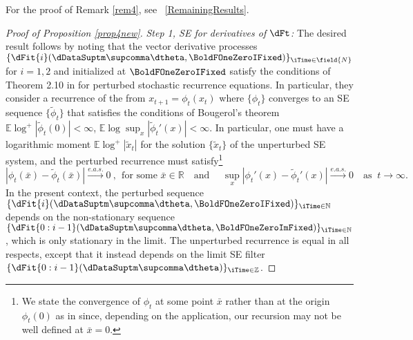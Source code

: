 



\proofskip\noindent 
For the proof of Remark \ref{rem4}, see \SupplementaryAppendix\ \ref{RemainingResults}.


\proofskip
%
%
%
%
\begin{proof}[Proof of Proposition \ref{prop4new}]
\textit{Step 1, SE for derivatives of $\dFt$:}
The desired result follows by noting that the vector derivative processes 
$\{\dFit{i}(\dDataSuptm\supcomma\dtheta,\BoldFOneZeroIFixed)\}_{\iTime\in \field{N}}$ 
for $i=1,2$ and initialized at $\BoldFOneZeroIFixed$ satisfy the conditions of Theorem 2.10 in \cite{smikosch2006} for perturbed stochastic recurrence equations. In particular, they consider a  recurrence of the from $x_{t+1} = \phi_{t}(x_{t})$ where $\{\phi_{t}\}$ converges to an  SE sequence $\{\tilde \phi_{t}\}$ that satisfies the conditions of Bougerol's theorem $\mathbb{E} \log^{+}|\tilde \phi_{t}(0) |<\infty$, $\mathbb{E} \log \sup_{x}|\tilde \phi_{t}'(x)|<\infty$. In particular, one must have a logarithmic moment  $\mathbb{E}\log^{+}|\tilde x_{t}|$ for the solution $\{\tilde x_{t}\}$  of the unperturbed SE system, and the perturbed recurrence must satisfy\footnote{We state the convergence of $\phi_{t}$ at some point $\bar{x}$ rather than at the origin $\phi_{t}(0)$ as in \cite{smikosch2006} since, depending on the application, our recursion may not be well defined at $\bar{x}=0$.} 
\begin{equation*}
	|\phi_{t}(\bar{x}) - \tilde\phi_{t}(\bar{x})| \stackrel{e.a.s.}{\to} 0 \ , \ \ \text{for some $\bar{x} \in \mathbb{R}$} \quad \text{and } \quad \sup_{x}|\phi_t'(x)-\tilde \phi_t'(x)| \stackrel{e.a.s.}{\to} 0 \quad \text{as } \ t \to \infty. 
\end{equation*}
In the present context, the perturbed sequence 
$\{\dFit{i}(\dDataSuptm\supcomma\dtheta,\BoldFOneZeroIFixed)\}_{\iTime \in \mathbb{N}}$
depends on the non-stationary sequence
$\{\dFit{0:i-1}(\dDataSuptm\supcomma\dtheta,\BoldFOneZeroImFixed)\}_{\iTime \in \mathbb{N}}$, 
which is only stationary in the limit. 
The unperturbed recurrence is equal in all respects, except that it instead depends on the limit SE filter 
$\{\dFit{0:i-1}(\dDataSuptm\supcomma\dtheta)\}_{\iTime \in \mathbb{Z}}$. 


\end{proof}

